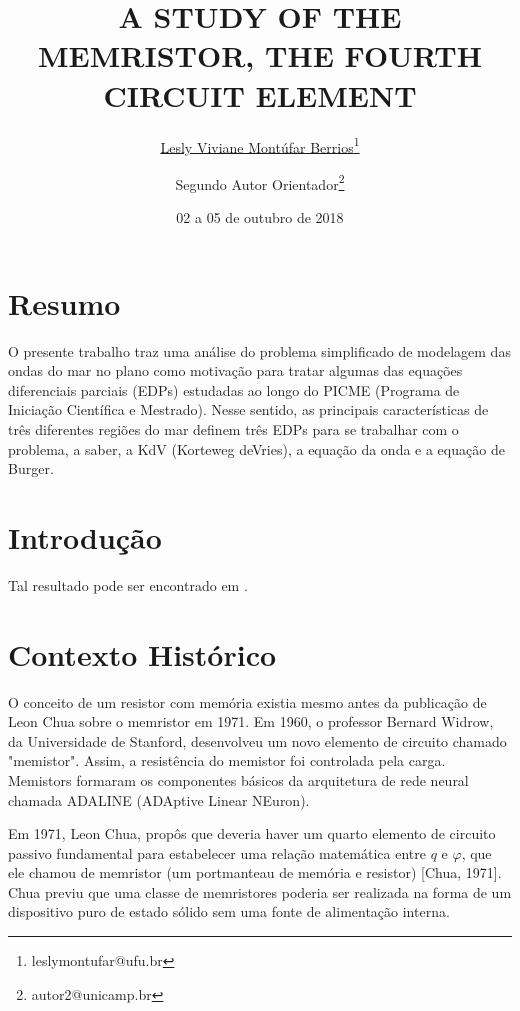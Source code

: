 \documentclass[10pt,twoside,a4paper]{article}
\date{02 a 05 de outubro de 2018}
\title{A STUDY OF THE MEMRISTOR, 
THE FOURTH CIRCUIT ELEMENT }
\author[1]{\underline{Lesly Viviane Montúfar Berrios}\thanks{leslymontufar@ufu.br}}
\author[2]{Segundo Autor Orientador\thanks{autor2@unicamp.br}}
\affil[1]{FEELT - Universidade Federal de Uberlândia}
\affil[2]{FAMAT - Universidade Federal de Uberlândia}
\begin{document}
\inserirtitulo
\linespread{1.5}%

\section{Resumo}
O presente trabalho traz uma análise do problema simplificado de modelagem das ondas do mar no plano como
motivação para tratar algumas das equações diferenciais parciais (EDPs) estudadas ao longo do PICME (Programa
de Iniciação Científica e Mestrado). Nesse sentido, as principais características de três diferentes regiões do mar
definem três EDPs para se trabalhar com o problema, a saber, a KdV (Korteweg deVries), a equação da onda e a
equação de Burger. %

\section{Introdução} %
\lipsum[2-3] %

Tal resultado pode ser encontrado em \cite{lamport94}.

\section{Contexto Histórico} %

O conceito de um resistor com memória existia mesmo antes da publicação de Leon Chua sobre o memristor em 1971. Em 1960, o professor Bernard Widrow, da Universidade de Stanford, desenvolveu um novo elemento de circuito chamado "memistor". Assim, a resistência do memistor foi controlada pela carga. Memistors formaram os componentes básicos da arquitetura de rede neural chamada ADALINE (ADAptive Linear NEuron).

Em 1971, Leon Chua, propôs que deveria haver um quarto elemento de circuito passivo fundamental para estabelecer uma relação matemática entre $q$ e $\varphi$, que ele chamou de memristor (um portmanteau de memória e resistor) [Chua, 1971]. Chua previu que uma classe de memristores poderia ser realizada na forma de um dispositivo puro de estado sólido sem uma fonte de alimentação interna.
\end{document}
